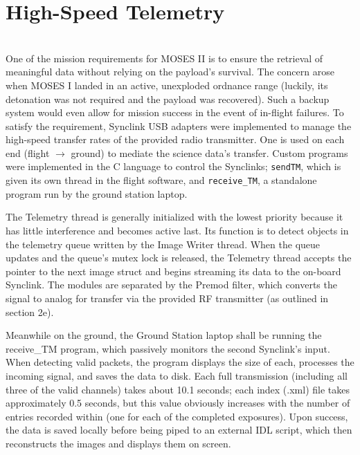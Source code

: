 \section{High-Speed Telemetry}
\hrulefill
\\
One of the mission requirements for MOSES II is to ensure the retrieval of meaningful data without relying on the payload's survival. The concern arose when MOSES I landed in an active, unexploded ordnance range (luckily, its detonation was not required and the payload was recovered). Such a backup system would even allow for mission success in the event of in-flight failures. To satisfy the requirement, Synclink USB adapters were implemented to manage the high-speed transfer rates of the provided radio transmitter. One is used on each end (flight $\rightarrow$ ground) to mediate the science data's transfer. Custom programs were implemented in the C language to control the Synclinks; \texttt{sendTM}, which is given its own thread in the flight software, and \texttt{receive\_TM}, a standalone program run by the ground station laptop.

The Telemetry thread is generally initialized with the lowest priority because it has little interference and becomes active last. Its function is to detect objects in the telemetry queue written by the Image Writer thread. When the queue updates and the queue's mutex lock is released, the Telemetry thread accepts the pointer to the next image struct and begins streaming its data to the on-board Synclink. The modules are separated by the Premod filter, which converts the signal to analog for transfer via the provided RF transmitter (as outlined in section 2e).

Meanwhile on the ground, the Ground Station laptop shall be running the receive\_TM program, which passively monitors the second Synclink's input. When detecting valid packets, the program displays the size of each, processes the incoming signal, and saves the data to disk. Each full transmission (including all three of the valid channels) takes about 10.1 seconds; each index (.xml) file takes approximately 0.5 seconds, but this value obviously increases with the number of entries recorded within (one for each of the completed exposures). Upon success, the data is saved locally before being piped to an external IDL script, which then reconstructs the images and displays them on screen.

